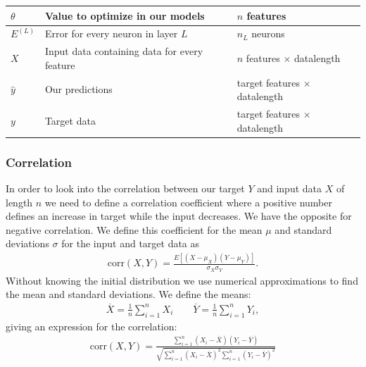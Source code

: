\documentclass[11pt]{article}
\begin{document}
\begin{table}[H]
\begin{small}
\begin{center}
\begin{tabular}{|l|l|l|}
                \hline
                $\theta$       & Value to optimize in our models                           & $n$ features                        \\
                \hline
                ${E}^{(L)}$    & Error for every neuron in layer $L$                       & $n_{L}$ neurons                     \\
                \hline
                $X$            & Input data containing data for every feature              & $n$ features $\times$ datalength    \\
                \hline
                $\hat{y}$      & Our predictions                                           & target features $\times$ datalength \\
                \hline
                $y$            & Target data                                               & target features $\times$ datalength \\
                \hline
            \end{tabular}
        \end{center}
    \end{small}
\end{table}
\subsubsection*{Correlation}
In order to look into the correlation between our target $Y$ and input data $X$ of length $n$ we need to define a correlation coefficient where a positive number defines an increase in target  while the input  decreases. We have the opposite for negative correlation. We define this coefficient for the mean $\mu$ and standard deviations $\sigma$ for the input and target data as
\begin{align*}
    \text{corr}(X, Y) = \frac{E[(X- \mu_X)(Y-\mu_Y)]}{\sigma_X\sigma_Y}.
\end{align*}
Without knowing the initial distribution we use numerical approximations to find the mean and standard deviations. We define the means:
\begin{align*}
    \overline{X} = \frac{1}{n}\sum_{i=1}^n X_i \quad\quad \overline{Y} = \frac{1}{n}\sum_{i=1}^n Y_i,
\end{align*}
giving an expression for the correlation:
\begin{align*}
    \text{corr}(X, Y) = \frac{\sum_{i=1}^n (X_i- \overline{X})(Y_i- \overline{Y})}{\sqrt{\sum_{i=1}^n (X_i- \overline{X})^2 \sum_{i=1}^n (Y_i- \overline{Y})^2}}
\end{align*}
\end{document}
